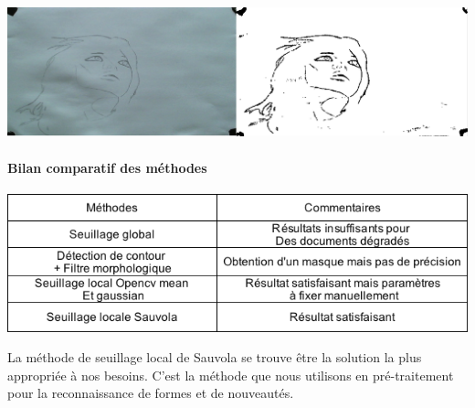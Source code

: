 \begin{center}
\includegraphics[width=\textwidth]{images/sauvola.png}
\end{center}

\paragraph{Bilan comparatif des méthodes\vspace{0.5cm}\\}

\begin{center}
\includegraphics[width=\textwidth]{images/methodescommentaire.png}
\end{center}

La méthode de seuillage local de Sauvola\cite{Sauvola00} se trouve être la solution la plus appropriée à nos besoins.
C'est la méthode que nous utilisons en pré-traitement pour la reconnaissance de formes et de nouveautés.   